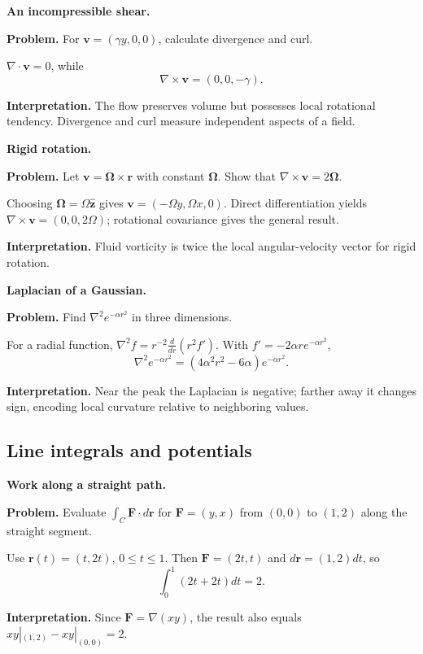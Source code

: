 \begin{workedexample}
\textbf{An incompressible shear.}\par
\textbf{Problem.} For $\mathbf v=(\gamma y,0,0)$, calculate divergence and curl.
\begin{solution}
$\nabla\cdot\mathbf v=0$, while
\[
\nabla\times\mathbf v=(0,0,-\gamma).
\]

\textbf{Interpretation.} The flow preserves volume but possesses local rotational tendency. Divergence and curl measure independent aspects of a field.
\end{solution}
\end{workedexample}

\begin{workedexample}
\textbf{Rigid rotation.}\par
\textbf{Problem.} Let $\mathbf v=\boldsymbol\Omega\times\mathbf r$ with constant $\boldsymbol\Omega$. Show that $\nabla\times\mathbf v=2\boldsymbol\Omega$.
\begin{solution}
Choosing $\boldsymbol\Omega=\Omega\hat{\mathbf z}$ gives $\mathbf v=(-\Omega y,\Omega x,0)$. Direct differentiation yields $\nabla\times\mathbf v=(0,0,2\Omega)$; rotational covariance gives the general result.

\textbf{Interpretation.} Fluid vorticity is twice the local angular-velocity vector for rigid rotation.
\end{solution}
\end{workedexample}

\begin{workedexample}
\textbf{Laplacian of a Gaussian.}\par
\textbf{Problem.} Find $\nabla^2 e^{-\alpha r^2}$ in three dimensions.
\begin{solution}
For a radial function, $\nabla^2f=r^{-2}\frac{d}{dr}(r^2f')$. With $f'=-2\alpha r e^{-\alpha r^2}$,
\[
\nabla^2e^{-\alpha r^2}=(4\alpha^2r^2-6\alpha)e^{-\alpha r^2}.
\]

\textbf{Interpretation.} Near the peak the Laplacian is negative; farther away it changes sign, encoding local curvature relative to neighboring values.
\end{solution}
\end{workedexample}

\subsection{Line integrals and potentials}

\begin{workedexample}
\textbf{Work along a straight path.}\par
\textbf{Problem.} Evaluate $\int_C\mathbf F\cdot d\mathbf r$ for $\mathbf F=(y,x)$ from $(0,0)$ to $(1,2)$ along the straight segment.
\begin{solution}
Use $\mathbf r(t)=(t,2t)$, $0\le t\le1$. Then $\mathbf F=(2t,t)$ and $d\mathbf r=(1,2)dt$, so
\[
\int_0^1(2t+2t)dt=2.
\]

\textbf{Interpretation.} Since $\mathbf F=\nabla(xy)$, the result also equals $xy|_{(1,2)}-xy|_{(0,0)}=2$.
\end{solution}
\end{workedexample}

